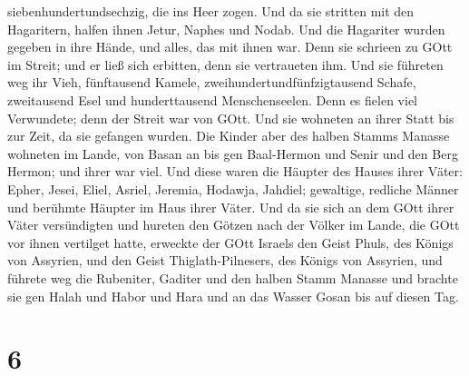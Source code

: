 siebenhundertundsechzig, die ins Heer zogen.  Und da sie
stritten mit den Hagaritern, halfen ihnen Jetur, Naphes und Nodab.
 Und die Hagariter wurden gegeben in ihre Hände, und alles,
das mit ihnen war. Denn sie schrieen zu GOtt im Streit; und er ließ sich
erbitten, denn sie vertraueten ihm.  Und sie führeten weg
ihr Vieh, fünftausend Kamele, zweihundertundfünfzigtausend Schafe,
zweitausend Esel und hunderttausend Menschenseelen.  Denn
es fielen viel Verwundete; denn der Streit war von GOtt. Und sie
wohneten an ihrer Statt bis zur Zeit, da sie gefangen wurden.
 Die Kinder aber des halben Stamms Manasse wohneten im
Lande, von Basan an bis gen Baal-Hermon und Senir und den Berg Hermon;
und ihrer war viel.  Und diese waren die Häupter des Hauses
ihrer Väter: Epher, Jesei, Eliel, Asriel, Jeremia, Hodawja, Jahdiel;
gewaltige, redliche Männer und berühmte Häupter im Haus ihrer Väter.
 Und da sie sich an dem GOtt ihrer Väter versündigten und
hureten den Götzen nach der Völker im Lande, die GOtt vor ihnen
vertilget hatte,  erweckte der GOtt Israels den Geist
Phuls, des Königs von Assyrien, und den Geist Thiglath-Pilnesers, des
Königs von Assyrien, und führete weg die Rubeniter, Gaditer und den
halben Stamm Manasse und brachte sie gen Halah und Habor und Hara und an
das Wasser Gosan bis auf diesen Tag.

\hypertarget{section-5}{%
\section{6}\label{section-5}}

